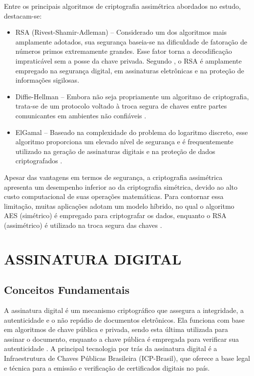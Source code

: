 Entre os principais algoritmos de criptografia assimétrica abordados no estudo, destacam-se:

\begin{itemize}
    \item RSA (Rivest-Shamir-Adleman) – Considerado um dos algoritmos mais amplamente adotados, sua segurança baseia-se na dificuldade de fatoração de números primos extremamente grandes. Esse fator torna a decodificação impraticável sem a posse da chave privada. Segundo , o RSA é amplamente empregado na segurança digital, em assinaturas eletrônicas e na proteção de informações sigilosas.
    \item Diffie-Hellman – Embora não seja propriamente um algoritmo de criptografia, trata-se de um protocolo voltado à troca segura de chaves entre partes comunicantes em ambientes não confiáveis \cite{viana2022criptografia}.
    \item ElGamal – Baseado na complexidade do problema do logaritmo discreto, esse algoritmo proporciona um elevado nível de segurança e é frequentemente utilizado na geração de assinaturas digitais e na proteção de dados criptografados \cite{viana2022criptografia}.
\end{itemize}

Apesar das vantagens em termos de segurança, a criptografia assimétrica apresenta um desempenho inferior ao da criptografia simétrica, devido ao alto custo computacional de suas operações matemáticas. Para contornar essa limitação, muitas aplicações adotam um modelo híbrido, no qual o algoritmo AES (simétrico) é empregado para criptografar os dados, enquanto o RSA (assimétrico) é utilizado na troca segura das chaves \cite{viana2022criptografia}.

\section{ASSINATURA DIGITAL}
\subsection{Conceitos Fundamentais}

A assinatura digital é um mecanismo criptográfico que assegura a integridade, a autenticidade e o não repúdio de documentos eletrônicos. Ela funciona com base em algoritmos de chave pública e privada, sendo esta última utilizada para assinar o documento, enquanto a chave pública é empregada para verificar sua autenticidade \cite{brasil2001medida}. A principal tecnologia por trás da assinatura digital é a Infraestrutura de Chaves Públicas Brasileira (ICP-Brasil), que oferece a base legal e técnica para a emissão e verificação de certificados digitais no país.

